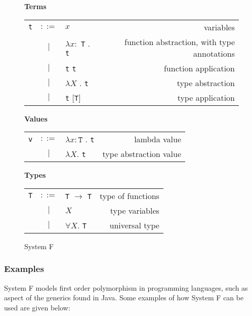 \begin{figure}[H]\label{fig:systemF}
    \vspace{1cm}
    \textbf{Terms} \\
    \begin{tabular}{l c p{3cm} r}
        \texttt{t} & $ ::= $ & $ x $ &                   variables \\
      & $ | $ & $ \lambda x : $ \texttt{T} . \texttt{t} &          function abstraction, with type annotations \\
      & $ | $ & \texttt{t} \texttt{t} &          function application \\
      & $ | $ & $ \lambda X $ . \texttt{t} &          type abstraction \\
      & $ | $ & \texttt{t} [\texttt{T}] &          type application \\
    \end{tabular}

    \vspace{1cm}
    \textbf{Values} \\
    \begin{tabular}{l c p{3cm} r}
        \texttt{v} & $ ::= $ & $ \lambda x : \texttt{T} $ . \texttt{t} &                   lambda value \\
      & $ | $ & $ \lambda X . $ \texttt{t} &   type abstraction value \\
    \end{tabular}

    \vspace{1cm}
    \textbf{Types} \\
    \begin{tabular}{l c p{3cm} r}
        \texttt{T} & $ ::= $ & \texttt{T} $ \rightarrow $ \texttt{T} &      type of functions \\
        & $ | $ & $ X $ &       type variables \\
        & $ | $ & $ \forall X . $ \texttt{T} &       universal type \\
    \end{tabular}

    \caption{System F}
\end{figure}

\subsubsection{Examples}
System F models first order polymorphism in programming languages, such as aspect of
the generics found in Java. Some examples of how System F can be used are given
below:

